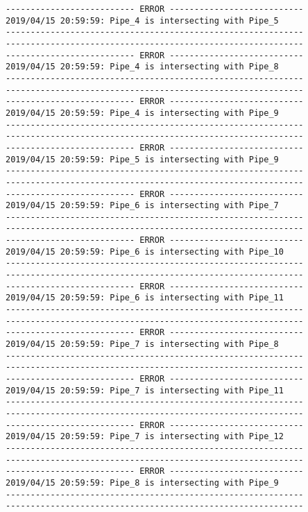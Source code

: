 \documentclass{article}
\begin{document}
{\begin{verbatim}
-------------------------- ERROR ---------------------------
2019/04/15 20:59:59: Pipe_4 is intersecting with Pipe_5
------------------------------------------------------------
------------------------------------------------------------
-------------------------- ERROR ---------------------------
2019/04/15 20:59:59: Pipe_4 is intersecting with Pipe_8
------------------------------------------------------------
------------------------------------------------------------
-------------------------- ERROR ---------------------------
2019/04/15 20:59:59: Pipe_4 is intersecting with Pipe_9
------------------------------------------------------------
------------------------------------------------------------
-------------------------- ERROR ---------------------------
2019/04/15 20:59:59: Pipe_5 is intersecting with Pipe_9
------------------------------------------------------------
------------------------------------------------------------
-------------------------- ERROR ---------------------------
2019/04/15 20:59:59: Pipe_6 is intersecting with Pipe_7
------------------------------------------------------------
------------------------------------------------------------
-------------------------- ERROR ---------------------------
2019/04/15 20:59:59: Pipe_6 is intersecting with Pipe_10
------------------------------------------------------------
------------------------------------------------------------
-------------------------- ERROR ---------------------------
2019/04/15 20:59:59: Pipe_6 is intersecting with Pipe_11
------------------------------------------------------------
------------------------------------------------------------
-------------------------- ERROR ---------------------------
2019/04/15 20:59:59: Pipe_7 is intersecting with Pipe_8
------------------------------------------------------------
------------------------------------------------------------
-------------------------- ERROR ---------------------------
2019/04/15 20:59:59: Pipe_7 is intersecting with Pipe_11
------------------------------------------------------------
------------------------------------------------------------
-------------------------- ERROR ---------------------------
2019/04/15 20:59:59: Pipe_7 is intersecting with Pipe_12
------------------------------------------------------------
------------------------------------------------------------
-------------------------- ERROR ---------------------------
2019/04/15 20:59:59: Pipe_8 is intersecting with Pipe_9
------------------------------------------------------------
------------------------------------------------------------

\end{verbatim}}
\end{document}
